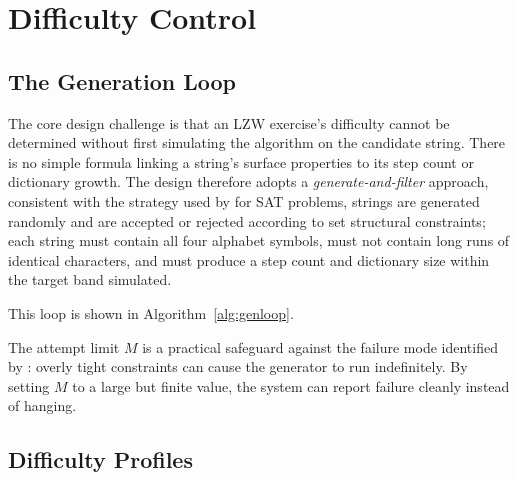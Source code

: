 \documentclass{l4proj}
\begin{document}
\section{Difficulty Control}

\subsection{The Generation Loop}

The core design challenge is that an LZW exercise’s difficulty cannot be determined without first simulating the algorithm on the candidate string. There is no simple formula linking a string’s surface properties to its step count or dictionary growth. The design therefore adopts a \emph{generate-and-filter} approach, consistent with the strategy used by \citet{Hoz21} for SAT problems, strings are generated randomly and are accepted or rejected according to set structural constraints; each string must contain all four alphabet symbols, must not contain long runs of identical characters, and must produce a step count and dictionary size within the target band simulated.

This loop is shown in Algorithm~\ref{alg:genloop}.

\begin{algorithm}
\DontPrintSemicolon
{}
\caption{The generate-and-filter loop for exercise generation.}
\label{alg:genloop}
\end{algorithm}

The attempt limit $M$ is a practical safeguard against the failure mode identified by \citet{Hoz21}: overly tight constraints can cause the generator to run indefinitely. By setting $M$ to a large but finite value, the system can report failure cleanly instead of hanging.

\subsection{Difficulty Profiles}
\end{document}
